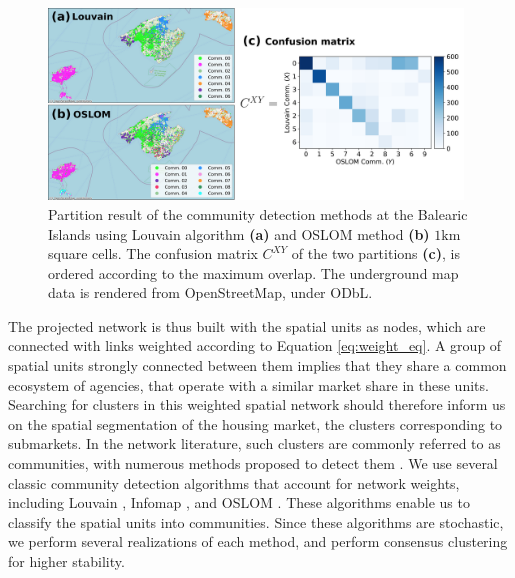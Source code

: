 \begin{figure}[t]
    \centering
    \includegraphics[width = 0.98\textwidth]{Figs/Idealista_segmentation/agreement_method.pdf}
	\caption[Agreement between different partitions.]{ Partition result of the community detection methods at the Balearic Islands using Louvain algorithm \textbf{(a)} and OSLOM method \textbf{(b)} $1 \textrm{km}$ square cells. The confusion matrix $C^{XY}$ of the two partitions \textbf{(c)}, is ordered according to the maximum overlap. The underground map data is rendered from OpenStreetMap, under ODbL. \label{fig:agreement_method}}
\end{figure}

The projected network is thus built with the spatial units as nodes, which are connected with links weighted according to Equation \ref{eq:weight_eq}. A group of spatial units strongly connected between them implies that they share a common ecosystem of agencies, that operate with a similar market share in these units.
Searching for clusters in this weighted spatial network should therefore inform us on the spatial segmentation of the housing market, the clusters corresponding to submarkets. In the network literature, such clusters are commonly referred to as communities, with numerous methods proposed to detect them \cite{fortunato2010community}. We use several classic community detection algorithms \cite{newman2004finding,rosvall-2008,blondel-2008,Louvain-Leiden,OSLOM} that account for network weights, including Louvain \cite{blondel-2008}, Infomap \cite{rosvall-2008}, and OSLOM \cite{OSLOM}. These algorithms enable us to classify the spatial units into communities. Since these algorithms are stochastic, we perform several realizations of each method, and perform consensus clustering \cite{lancichinetti2012consensus} for higher stability.

